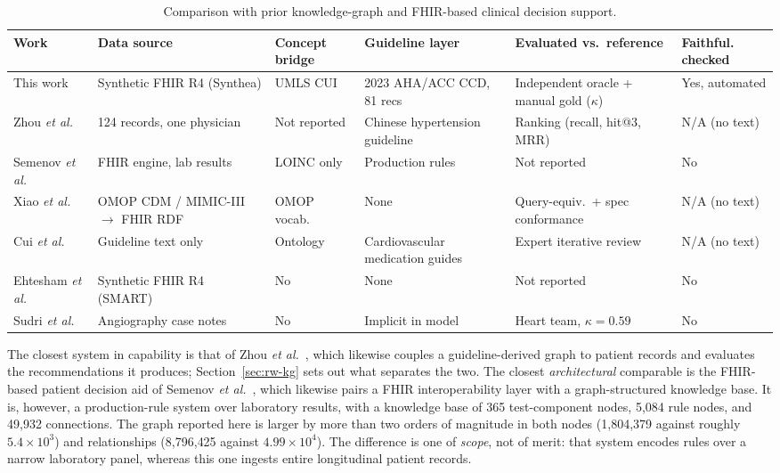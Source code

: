 \begin{table}[h]
\centering
\caption{Comparison with prior knowledge-graph and FHIR-based clinical decision support.}
\label{tab:prior-systems}
\footnotesize
\setlength{\tabcolsep}{3pt}
\begin{tabular}{p{22mm}p{20mm}p{18mm}p{18mm}p{24mm}p{16mm}}
\hline
\textbf{Work} & \textbf{Data source} & \textbf{Concept bridge} & \textbf{Guideline layer}
& \textbf{Evaluated vs.\ reference} & \textbf{Faithful. checked} \\
\hline
This work
  & Synthetic FHIR R4 (Synthea)
  & UMLS CUI
  & 2023 AHA/ACC CCD, 81 recs
  & Independent oracle + manual gold ($\kappa$)
  & Yes, automated \\
Zhou \textit{et al.} \cite{zhou2022}
  & 124 records, one physician
  & Not reported
  & Chinese hypertension guideline
  & Ranking (recall, hit@3, MRR)
  & N/A (no text) \\
Semenov \textit{et al.} \cite{semenov2018}
  & FHIR engine, lab results
  & LOINC only
  & Production rules
  & Not reported
  & No \\
Xiao \textit{et al.} \cite{xiao2022}
  & OMOP CDM / MIMIC-III $\rightarrow$ FHIR RDF
  & OMOP vocab.
  & None
  & Query-equiv.\ + spec conformance
  & N/A (no text) \\
Cui \textit{et al.} \cite{cui2025}
  & Guideline text only
  & Ontology
  & Cardiovascular medication guides
  & Expert iterative review
  & N/A (no text) \\
Ehtesham \textit{et al.} \cite{ehtesham2025}
  & Synthetic FHIR R4 (SMART)
  & No
  & None
  & Not reported
  & No \\
Sudri \textit{et al.} \cite{sudri2024}
  & Angiography case notes
  & No
  & Implicit in model
  & Heart team, $\kappa = 0.59$
  & No \\
\hline
\end{tabular}

\vspace{2pt}
\end{table}

The closest system in capability is that of Zhou \textit{et al.}~\cite{zhou2022}, which
likewise couples a guideline-derived graph to patient records and evaluates the
recommendations it produces; Section~\ref{sec:rw-kg} sets out what separates the two.
The closest \emph{architectural} comparable is the FHIR-based patient decision aid of Semenov
\textit{et al.}~\cite{semenov2018}, which likewise pairs a FHIR interoperability layer with
a graph-structured knowledge base. It is, however, a production-rule system
over laboratory results, with a knowledge base of 365 test-component nodes,
5{,}084 rule nodes, and 49{,}932 connections. The graph
reported here is larger by more than two orders of magnitude in both nodes
(1{,}804{,}379 against roughly $5.4\times10^{3}$) and relationships
(8{,}796{,}425 against $4.99\times10^{4}$). The difference is one of
\emph{scope}, not of merit: that system encodes rules over a narrow laboratory panel,
whereas this one ingests entire longitudinal patient records.

